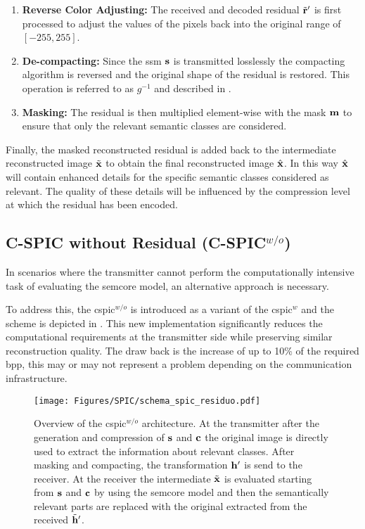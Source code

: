 \begin{enumerate}
    \item \textbf{Reverse Color Adjusting:} The received and decoded residual $\tilde{\mathbf{r}}'$ is first processed to adjust the values of the pixels back into the original range of $[-255, 255]$.

    \item \textbf{De-compacting:} Since the \gls{ssm} $\mathbf{s}$ is transmitted losslessly the compacting algorithm is reversed and the original shape of the residual is restored. This operation is referred to as $g^{-1}$ and described in .

    \item \textbf{Masking:} The residual is then multiplied element-wise with the mask $\mathbf{m}$ to ensure that only the relevant semantic classes are considered.
\end{enumerate}

Finally, the masked reconstructed residual is added back to the intermediate reconstructed image $\tilde{\mathbf{x}}$ to obtain the final reconstructed image $\hat{\mathbf{x}}$. In this way $\hat{\mathbf{x}}$ will contain enhanced details for the specific semantic classes considered as relevant. The quality of these details will be influenced by the compression level at which the residual has been encoded.

\subsection{C-SPIC without Residual (C-SPIC$^{w/o}$)}\label{sec: SPIC image dsslic}

In scenarios where the transmitter cannot perform the computationally intensive task of evaluating the \gls{semcore} model, an alternative approach is necessary.

To address this, the \gls{cspic}$^{w/o}$ is introduced as a variant of the \gls{cspic}$^w$ and the scheme is depicted in . This new implementation significantly reduces the computational requirements at the transmitter side while preserving similar reconstruction quality. The draw back is the increase of up to 10\% of the required \gls{bpp}, this may or may not represent a problem depending on the communication infrastructure.

\begin{figure}
    \centering
    \texttt{[image: Figures/SPIC/schema\_spic\_residuo.pdf]}
    \caption[\acrshort{cspic}$^{w/o}$ architecture scheme]{Overview of the \acrshort{cspic}$^{w/o}$ architecture. At the transmitter after the generation and compression of $\mathbf{s}$ and  $\mathbf{c}$ the original image is directly used to extract the information about relevant classes. After masking and compacting, the transformation $\mathbf{h}'$ is send to the receiver. At the receiver the intermediate $\tilde{\mathbf{x}}$ is evaluated starting from $\mathbf{s}$ and $\mathbf{c}$ by using the \acrshort{semcore} model and then the semantically relevant parts are replaced with the original extracted from the received $\tilde{\mathbf{h}}'$.} 
    \label{fig: SPIC cspic without scheme}
\end{figure}

